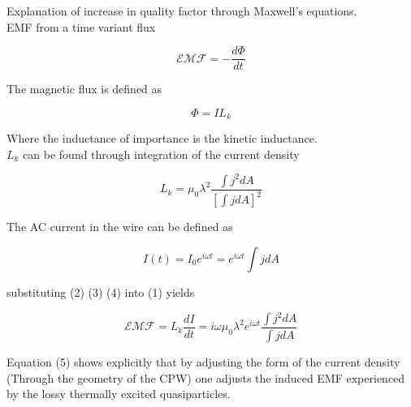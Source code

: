 \documentclass[12pt]{article}
\begin{document}
Explanation of increase in quality factor through Maxwell's equations. \\

EMF from a time variant flux

\begin{equation}
\mathcal{EMF} =  -\frac{d\Phi}{dt} 
\end{equation}

The magnetic flux is defined as

\begin{equation}
\Phi = IL_k
\end{equation}

Where the inductance of importance is the kinetic inductance. \\

$L_k$ can be found through integration of the current density

\begin{equation}
L_k = \mu_0 \lambda^2 \frac{\int j^2 dA}{\left[\int j dA\right]^2}
\end{equation}

The AC current in the wire can be defined as

\begin{equation}
I(t) = I_0 e^{i\omega t} = e^{i\omega t}\int jdA
\end{equation}

substituting (2) (3) (4) into (1) yields

\begin{equation}
\mathcal{EMF} = L_k \frac{dI}{dt} = i \omega \mu_0 \lambda^2 e^{i \omega t} \frac{\int j^2 dA}{\int j dA}
\end{equation}

Equation (5) shows explicitly that by adjusting the form of the current density (Through the geometry of the CPW) one adjusts the induced EMF experienced by the lossy thermally excited quasiparticles.
\end{document}
